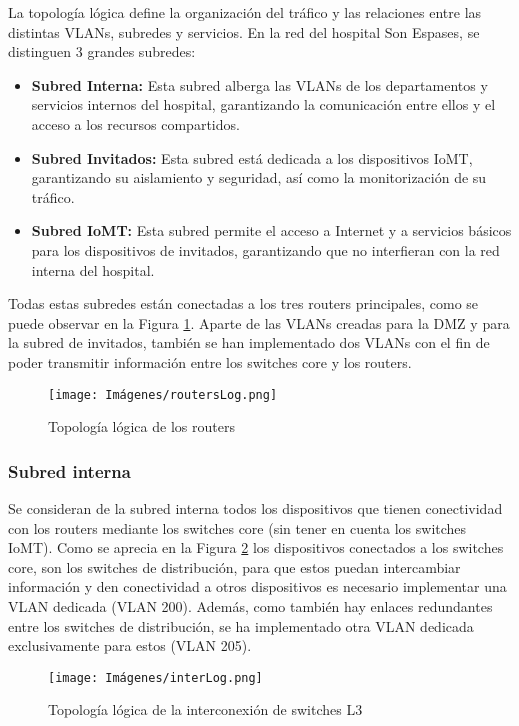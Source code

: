 La topología lógica define la organización del tráfico y las relaciones entre las distintas VLANs, subredes y servicios. 
En la red del hospital Son Espases, se distinguen 3 grandes subredes:
\begin{itemize}
    \item \textbf{Subred Interna:} Esta subred alberga las VLANs de los departamentos y servicios
 internos del hospital, garantizando la comunicación entre ellos y el acceso a los
 recursos compartidos.
    \item \textbf{Subred Invitados:} Esta subred está dedicada a los dispositivos IoMT, garantizando su
 aislamiento y seguridad, así como la monitorización de su tráfico.
    \item \textbf{Subred IoMT:} Esta subred permite el acceso a Internet y a servicios básicos
 para los dispositivos de invitados, garantizando que no interfieran con la red
 interna del hospital.
\end{itemize}

Todas estas subredes están conectadas a los tres routers principales, como se puede observar en la Figura \ref{fig:interco}. Aparte de las VLANs creadas para la DMZ y para la subred de invitados, 
también se han implementado dos VLANs con el fin de poder transmitir información entre los switches core y los routers.
\begin{figure}[H]
    \centering
    \texttt{[image: Imágenes/routersLog.png]}
    \caption{Topología lógica de los routers}
    \label{fig:interco} 
\end{figure}

\subsubsection{Subred interna}
Se consideran de la subred interna todos los dispositivos que tienen conectividad con los routers mediante los switches core (sin tener en cuenta los switches IoMT). Como se aprecia en la Figura \ref{fig:intercoLog} 
los dispositivos conectados a los switches core, son los switches de distribución, para que estos puedan intercambiar información y den conectividad a otros dispositivos es necesario 
implementar una VLAN dedicada (VLAN 200). Además, como también hay enlaces redundantes entre los switches de distribución, se ha implementado otra VLAN dedicada exclusivamente para estos (VLAN 205).
\begin{figure}[H]
    \centering
    \texttt{[image: Imágenes/interLog.png]}
    \caption{Topología lógica de la interconexión de switches L3}
    \label{fig:intercoLog} 
\end{figure}

